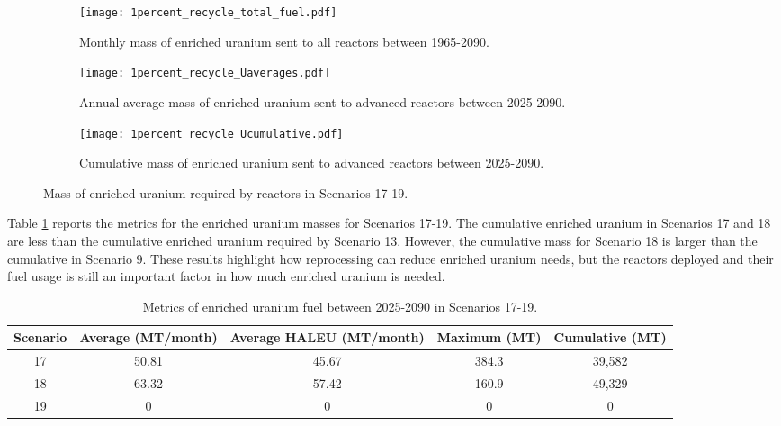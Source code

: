 \begin{figure}[h!]
    \centering
    \begin{subfigure}[b]{0.45\textwidth}
        \centering
        \texttt{[image: 1percent\_recycle\_total\_fuel.pdf]}
        \caption{Monthly mass of enriched uranium sent to all reactors 
        between 1965-2090.}
        \label{fig:1percent_recycle_all_uranium}
    \end{subfigure}
    \hfill
    \begin{subfigure}[b]{0.45\textwidth}
        \centering
        \texttt{[image: 1percent\_recycle\_Uaverages.pdf]}
        \caption{Annual average mass of enriched uranium sent to 
        advanced reactors between 2025-2090.}
        \label{fig:1percent_recycle_AR_uranium}
    \end{subfigure}
    \begin{subfigure}[b]{0.45\textwidth}
        \centering
        \texttt{[image: 1percent\_recycle\_Ucumulative.pdf]}
        \caption{Cumulative mass of enriched 
        uranium sent to advanced reactors between 2025-2090.}
        \label{fig:1percent_recycle_uranium_cumulative}
    \end{subfigure}
       \caption{Mass of enriched uranium required by reactors
        in Scenarios 17-19.}
       \label{fig:1percent_recycle_uranium}
\end{figure}

Table \ref{tab:s17-19_enrichedU} reports the metrics for the enriched 
uranium masses for Scenarios 17-19. The cumulative enriched 
uranium in Scenarios 17 and 18 are less than the cumulative 
enriched uranium required by Scenario 13. However, the cumulative 
mass for Scenario 18 is larger than the cumulative in Scenario 
9. These results highlight how reprocessing can reduce enriched 
uranium needs, but the reactors deployed and their fuel usage 
is still an important factor in how much enriched uranium is 
needed. 

\begin{table}[h!]
    \centering 
    \caption{Metrics of enriched uranium fuel between 2025-2090 in Scenarios 
    17-19.}
    \label{tab:s17-19_enrichedU}
    \begin{tabular}{c c c c c}
        \hline 
        Scenario & Average (MT/month) & Average HALEU (MT/month) &  
        Maximum (MT) & Cumulative (MT) \\
        \hline
        17 & 50.81 & 45.67 & 384.3 & 39,582\\
        18 & 63.32 & 57.42 & 160.9 & 49,329\\
        19 & 0 & 0 & 0 & 0\\
        \hline
    \end{tabular}
\end{table}

